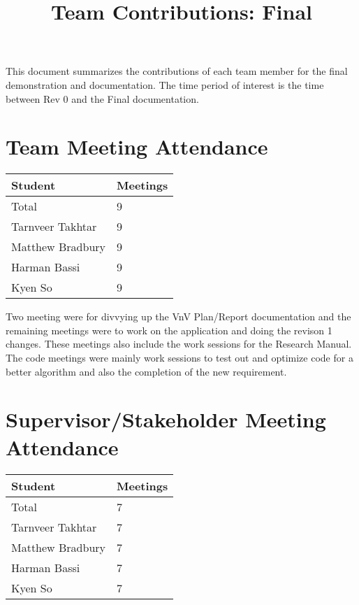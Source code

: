 \documentclass{article}
\title{Team Contributions: Final\\\progname}
\author{\authname}
\date{}
\begin{document}
\maketitle

This document summarizes the contributions of each team member for the final
demonstration and documentation.  The time period of interest is the time
between Rev 0 and the Final documentation.

\section{Team Meeting Attendance}

\begin{table}[H]
    \centering
    \begin{tabular}{ll}
    \toprule
    \textbf{Student} & \textbf{Meetings}\\
    \midrule
    Total & 9\\
    Tarnveer Takhtar & 9\\
    Matthew Bradbury & 9\\
    Harman Bassi & 9\\
    Kyen So & 9\\
    \bottomrule
    \end{tabular}
    \end{table}

Two meeting were for divvying up the VnV Plan/Report documentation and the remaining meetings were to work on the application and doing the revison 1 changes. 
These meetings also include the work sessions for the Research Manual. 
The code meetings were mainly work sessions to test out and optimize code for a better algorithm and also the completion of the new requirement.

\section{Supervisor/Stakeholder Meeting Attendance}

\begin{table}[H]
    \centering
    \begin{tabular}{ll}
    \toprule
    \textbf{Student} & \textbf{Meetings}\\
    \midrule
    Total & 7\\
    Tarnveer Takhtar & 7\\
    Matthew Bradbury & 7\\
    Harman Bassi & 7\\
    Kyen So & 7\\
    \bottomrule
    \end{tabular}
    \end{table}
\end{document}
